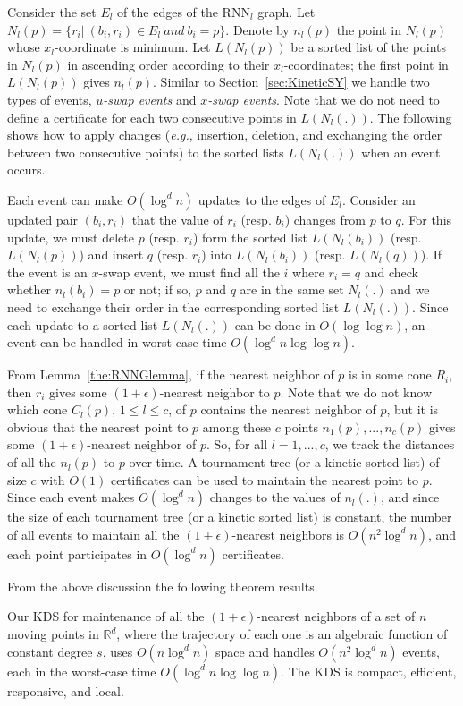 \documentclass[11pt]{llncs}
\newcommand{\eg}{\emph{e.g.}}
\begin{document}
Consider the set $E_l$ of the edges of the RNN$_l$ graph. Let $N_l(p)=\{r_i|~(b_i,r_i)\in E_l~and~b_i=p\}$. Denote by $n_l(p)$ the point in $N_l(p)$ whose $x_l$-coordinate is minimum. Let $L(N_l(p))$ be a sorted list of the points in $N_l(p)$ in ascending order according to their $x_l$-coordinates; the first point in $L(N_l(p))$ gives $n_l(p)$. Similar to Section~\ref{sec:KineticSY} we handle two types of events, \textit{$u$-swap events} and \textit{$x$-swap events}. Note that we do not need to define a certificate for each two consecutive points in $L(N_l(.))$.  The following shows how to apply changes (\eg, insertion, deletion, and exchanging the order between two consecutive points) to the sorted lists $L(N_l(.))$ when an event occurs.

Each event can make $O(\log^d n)$ updates to the edges of $E_l$. Consider an updated pair $(b_i,r_i)$ that the value of $r_i$ (resp. $b_i$) changes from $p$ to $q$. For this update, we must delete $p$ (resp. $r_i$) form the sorted list $L(N_l(b_i))$ (resp. $L(N_l(p))$) and insert $q$ (resp. $r_i$) into $L(N_l(b_i))$ (resp. $L(N_l(q))$). If the event is an $x$-swap event, we must find all the $i$ where $r_i=q$ and check whether $n_l(b_i)=p$ or not; if so, $p$ and $q$ are in the same set $N_l(.)$ and we need to exchange their order in the corresponding sorted list $L(N_l(.))$. Since each update to a sorted list $L(N_l(.))$ can be done in $O(\log\log n)$, an event can be handled in worst-case time $O(\log^dn\log\log n)$.



From Lemma~\ref{the:RNNGlemma}, if the nearest neighbor of $p$ is in some cone $R_i$, then $r_i$ gives some $(1+\epsilon)$-nearest neighbor to $p$. Note that we do not know which cone $C_l(p)$, $1\leq l\leq c$, of $p$ contains the nearest neighbor of $p$, but it is obvious that the nearest point to $p$ among these $c$ points $n_1(p),...,n_c(p)$ gives some $(1+\epsilon)$-nearest neighbor of $p$. So, for all $l=1,...,c$, we track the distances of all the $n_l(p)$ to $p$ over time. A tournament tree (or a kinetic sorted list) of size $c$ with $O(1)$ certificates can be used to maintain the nearest point to $p$. Since each event makes $O(\log^d n)$ changes to the values of $n_l(.)$, and since the size of each tournament tree (or a kinetic sorted list) is constant, the number of all events to maintain all the $(1+\epsilon)$-nearest neighbors is $O(n^2\log^d n)$, and each point participates in $O(\log^d n)$ certificates.

From the above discussion the following theorem results.
\begin{theorem}\label{the:KinEpsANN}
Our KDS for maintenance of all the $(1+\epsilon)$-nearest neighbors of a set of $n$ moving points in $\mathbb{R}^d$, where the trajectory of each one is an algebraic function of constant degree $s$, uses $O(n\log^{d} n)$ space and handles $O(n^2\log^d n)$ events, each in the worst-case time $O(\log^d n\log\log n)$. The KDS is compact, efficient, responsive, and local.
\end{theorem}
\end{document}
